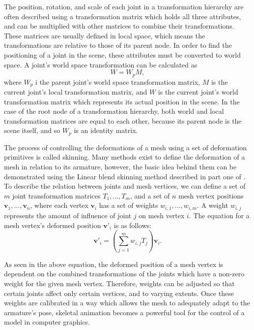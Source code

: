 The position, rotation, and scale of each joint in a transformation hierarchy
are often described using a transformation matrix which holds all three
attributes, and can be multiplied with other matrices to combine their
transformations. These matrices are usually defined in local space, which means
the transformations are relative to those of its parent node. In order to find
the positioning of a joint in the scene, these attributes must be converted to
world space. A joint's world space transformation can be calculated as
\begin{equation}
    W = W_p M, 
\end{equation}
where \(W_p\) i the parent joint's world space transformation matrix, \(M\) is
the current joint's local transformation matrix, and \(W\) is the current
joint's world transformation matrix which represents its actual position in the
scene. In the case of the root node of a transformation hierarchy, both world
and local transformation matrices are equal to each other, because its parent
node is the scene itself, and so \(W_p\) is an identity matrix.

The process of controlling the deformations of a mesh using a set of deformation
primitives is called skinning. Many methods exist to define the deformation of
a mesh in relation to its armature, however, the basic idea behind them can be
demonstrated using the Linear blend skinning method described in part one of
\cite{skinning}. To describe the relation between joints and mesh vertices, we
can define a set of \(m\) joint transformation matrices \(T_1, \dots, T_m\), and
a set of \(n\) mesh vertex positions \(\mathbf{v}_1, \dots, \mathbf{v}_n\),
where each vertex \(\mathbf{v}_i\) has a set of weights \(w_{i,1}, \dots,
w_{i,m}\). A weight \(w_{i,j}\) represents the amount of influence of joint
\(j\) on mesh vertex \(i\). The equation for a mesh vertex's deformed position
\(\mathbf{v'}_i\) is as follows:
\begin{equation}
    \mathbf{v'}_i = \left(\sum_{j=1}^m w_{i,j} T_j \right) \mathbf{v}_i.
\end{equation}

As seen in the above equation, the deformed position of a mesh vertex is
dependent on the combined transformations of the joints which have a non-zero
weight for the given mesh vertex. Therefore, weights can be adjusted so that certain
joints affect only certain vertices, and to varying extents. Once these weights are
calibrated in a way which allows the mesh to adequately adapt to the armature's
pose, skeletal animation becomes a powerful tool for the control of a model in
computer graphics.

